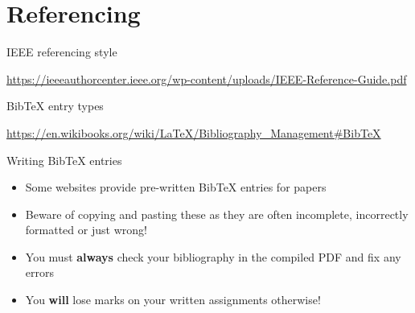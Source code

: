 \part{Referencing}
\frame{\partpage}

\begin{frame}{IEEE referencing style}
	\begin{center}
		\small\url{https://ieeeauthorcenter.ieee.org/wp-content/uploads/IEEE-Reference-Guide.pdf}
	\end{center}
\end{frame}

\begin{frame}{BibTeX entry types}
	\begin{center}
		\small\url{https://en.wikibooks.org/wiki/LaTeX/Bibliography_Management\#BibTeX}
	\end{center}
\end{frame}

\begin{frame}{Writing BibTeX entries}
	\begin{itemize}
		\pause\item Some websites provide pre-written BibTeX entries for papers
		\pause\item Beware of copying and pasting these as they are often incomplete, incorrectly formatted or just wrong!
		\pause\item You must \textbf{always} check your bibliography in the compiled PDF and fix any errors
		\pause\item You \textbf{will} lose marks on your written assignments otherwise!
	\end{itemize}
\end{frame}

